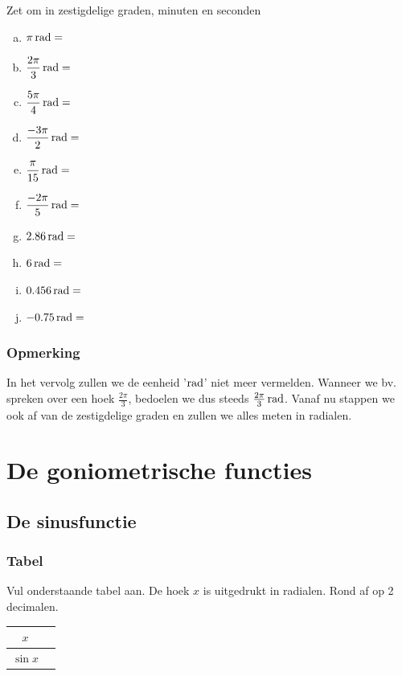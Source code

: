 \documentclass[a4paper,12pt,twoside ]{article}
\begin{document}
\begin{oefening} Zet om in zestigdelige graden, minuten en seconden
\begin{multicols}{2}
\begin{enumerate}[(a)]
  \itemsep1em
  \item $\pi \rad=$\arulefill
  \item $\dfrac{2\pi}{3} \rad=$\arulefill
  \item $\dfrac{5\pi}{4} \rad=$\arulefill
  \item $\dfrac{-3\pi}{2} \rad=$\arulefill
  \item $\dfrac{\pi}{15} \rad=$\arulefill
  \item $\dfrac{-2\pi}{5} \rad=$\arulefill
  \item $2.86 \rad=$\arulefill
  \item $6 \rad=$\arulefill
  \item $0.456 \rad=$\arulefill
  \item $-0.75 \rad=$\arulefill
\end{enumerate}
\end{multicols}
\end{oefening}

\subsubsection{Opmerking}
In het vervolg zullen we de eenheid '$\rad$' niet meer vermelden. Wanneer we bv. spreken over een hoek  $\frac{2\pi}{3}$, bedoelen we dus steeds  $\frac{2\pi}{3} \rad$. Vanaf nu stappen we ook af van de zestigdelige graden en zullen we alles meten in radialen.

\newpage
\section{De goniometrische functies}
\subsection{De sinusfunctie}
\subsubsection{Tabel}
Vul onderstaande tabel aan. De hoek $x$ is uitgedrukt in radialen. Rond af op 2 decimalen.

\begin{center}
  \begin{tabular}{c|p{14cm}}
    $x$ & \\
    \hline
    $\sin x$
  \end{tabular}
\end{center}
\end{document}
